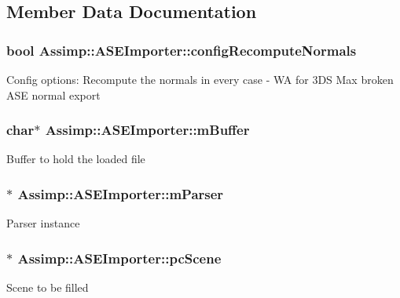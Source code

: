 \subsection{Member Data Documentation}
\hypertarget{class_assimp_1_1_a_s_e_importer_a917adc76013c307d6896fb4e71658354}{
\subsubsection[{config\+Recompute\+Normals}]{\setlength{\rightskip}{0pt plus 5cm}bool Assimp\+::\+A\+S\+E\+Importer\+::config\+Recompute\+Normals\hspace{0.3cm}{\ttfamily [protected]}}}\label{class_assimp_1_1_a_s_e_importer_a917adc76013c307d6896fb4e71658354}
Config options\+: Recompute the normals in every case -\/ W\+A for 3\+D\+S Max broken A\+S\+E normal export \hypertarget{class_assimp_1_1_a_s_e_importer_a1ad4f1b3c0277112264368cb5535a922}{
\subsubsection[{m\+Buffer}]{\setlength{\rightskip}{0pt plus 5cm}char$\ast$ Assimp\+::\+A\+S\+E\+Importer\+::m\+Buffer\hspace{0.3cm}{\ttfamily [protected]}}}\label{class_assimp_1_1_a_s_e_importer_a1ad4f1b3c0277112264368cb5535a922}
Buffer to hold the loaded file \hypertarget{class_assimp_1_1_a_s_e_importer_af102f01e30484afd056e3b518fb9752b}{
\subsubsection[{m\+Parser}]{$\ast$ Assimp\+::\+A\+S\+E\+Importer\+::m\+Parser\hspace{0.3cm}{\ttfamily [protected]}}}\label{class_assimp_1_1_a_s_e_importer_af102f01e30484afd056e3b518fb9752b}
Parser instance \hypertarget{class_assimp_1_1_a_s_e_importer_aeb0f353b00138c1c502e4475c9dc7162}{
\subsubsection[{pc\+Scene}]{$\ast$ Assimp\+::\+A\+S\+E\+Importer\+::pc\+Scene\hspace{0.3cm}{\ttfamily [protected]}}}\label{class_assimp_1_1_a_s_e_importer_aeb0f353b00138c1c502e4475c9dc7162}
Scene to be filled 

